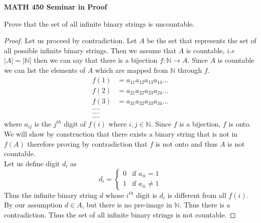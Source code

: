 \documentclass[14pt]{article}
\newcommand{\N}{\mathbb N}
\begin{document}
\begin{center}
		
{\bf MATH 450 Seminar in Proof}
 \\
\end{center}
	Prove that the set of all infinite binary strings is uncountable.
\begin{proof}
	Let us proceed by contradiction. Let $A$ be the set that represents the set of all possible infinite binary strings. Then we assume that $A$ is countable, $i.e$ $|A| = | \N |$ then we can say that there is a bijection $f: \N \rightarrow A$. Since $A$ is countable we can list the elements of $A$ which are mapped from $\N$ through $f$.
	\begin{align*}
	f(1) &= a_{11} a_{12}a_{13}a_{14}... \\
	f(2) &= a_{21}a_{22}a_{23}a_{24}... \\
	f(3) &= a_{31}a_{32}a_{33}a_{34}... \\
	....\\
	....\\
	.... 		
	\end{align*}
	where $a_{ij}$ is the $j^{th}$ digit of $f(i)$ where $i,j \in \N$. Since $f$ is a bijection, $f$ is onto. We will show by construction that there exists a binary string that is not in $f(A)$ therefore proving by contradiction that $f$ is not onto and thus $A$ is not countable. \\Let us define digit $d_i$ as
	 \[
d_i =
\begin{cases}
 0 & \text{if } a_{ii} = 1 \\
 1 & \text{if } a_{ii} \neq 1
\end{cases}
\] 
Thus the infinite binary string $d$ whose $i^{th}$ digit is $d_i$ is different from all $f(i)$. By our assumption $d \in A$, but there is no pre-image in $\N$. Thus there is a contradiction. Thus the set of all infinite binary strings is not countable. 
\end{proof}
\end{document}
